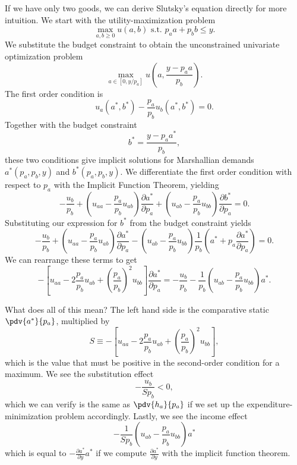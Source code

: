 If we have only two goods, we can derive Slutsky's equation directly for more intuition. We start with the utility-maximization problem 
$$
\max _{a, b \geq 0} u(a, b) \text { s.t. } p_{a} a+p_{b} b \leq y.
$$
We substitute the budget constraint to obtain the unconstrained univariate optimization problem 
$$
\max _{a \in\left[0, y / p_{a}\right]} u\left(a, \frac{y-p_{a} a}{p_{b}}\right).
$$
The first order condition is 
$$
u_{a}\left(a^{*}, b^{*}\right)-\frac{p_{a}}{p_{b}} u_{b}\left(a^{*}, b^{*}\right)=0.
$$
Together with the budget constraint 
$$
b^{*}=\frac{y-p_{a} a^{*}}{p_{b}},
$$
these two conditions give implicit solutions for Marshallian demands $a^*(p_a, p_b, y)$ and $b^*(p_a, p_b, y)$.
We differentiate the first order condition with respect to $p_a$ with the Implicit Function Theorem, yielding 
$$
-\frac{u_{b}}{p_{b}}+\left(u_{a a}-\frac{p_{a}}{p_{b}} u_{a b}\right) \frac{\partial a^{*}}{\partial p_{a}}+\left(u_{a b}-\frac{p_{a}}{p_{b}} u_{b b}\right) \frac{\partial b^{*}}{\partial p_{a}}=0.
$$
Substituting our expression for $b^*$ from the budget constraint yields 
$$
-\frac{u_{b}}{p_{b}}+\left(u_{a a}-\frac{p_{a}}{p_{b}} u_{a b}\right) \frac{\partial a^{*}}{\partial p_{a}}-\left(u_{a b}-\frac{p_{a}}{p_{b}} u_{b b}\right) \frac{1}{p_{b}}\left(a^{*}+p_{a} \frac{\partial a^{*}}{\partial p_{a}}\right)=0.
$$
We can rearrange these terms to get
$$
-\left[u_{a a}-2 \frac{p_{a}}{p_{b}} u_{a b}+\left(\frac{p_{a}}{p_{b}}\right)^{2} u_{b b}\right] \frac{\partial a^{*}}{\partial p_{a}}=-\frac{u_{b}}{p_{b}}-\frac{1}{p_{b}}\left(u_{a b}-\frac{p_{a}}{p_{b}} u_{b b}\right) a^{*}.
$$

What does all of this mean? The left hand side is the comparative static $\pdv{a^*}{p_a}$, multiplied by
$$
S \equiv -\left[u_{a a}-2 \frac{p_{a}}{p_{b}} u_{a b}+\left(\frac{p_{a}}{p_{b}}\right)^{2} u_{b b}\right],
$$
which is the value that must be positive in the second-order condition for a maximum. We see the substitution effect 
$$
-\frac{u_{b}}{S p_{b}}<0,
$$
which we can verify is the same as $\pdv{h_a}{p_a}$ if we set up the expenditure-minimization problem accordingly. Lastly, we see the income effect 
$$
-\frac{1}{S p_{b}}\left(u_{a b}-\frac{p_{a}}{p_{b}} u_{b b}\right) a^{*}
$$
which is equal to $-\frac{\partial a^{*}}{\partial y} a^{*}$ if we compute $\frac{\partial a^{*}}{\partial y}$ with the implicit function theorem.

